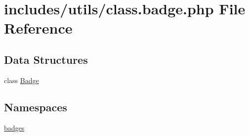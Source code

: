 \hypertarget{class_8badge_8php}{}\section{includes/utils/class.badge.\+php File Reference}
\label{class_8badge_8php}
\subsection*{Data Structures}
\begin{DoxyCompactItemize}
\item 
class \hyperlink{class_badge}{Badge}
\end{DoxyCompactItemize}
\subsection*{Namespaces}
\begin{DoxyCompactItemize}
\item 
 \hyperlink{namespacebadges}{badges}
\end{DoxyCompactItemize}

